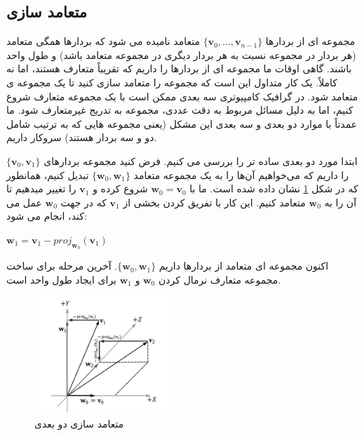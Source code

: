 \subsection{\textbf{متعامد سازی}}
\label{subsec:1.3.1}
{
    \Large
    \begin{spacing}{1.5}
        مجموعه ای از بردارها $\{\textbf{v}_{0},...,\textbf{v}_{n-1}\}$ متعامد نامیده می شود که بردارها همگی متعامد (هر بردار در مجموعه نسبت به هر بردار دیگری در مجموعه متعامد باشد) و طول واحد باشند.
        گاهی اوقات ما مجموعه ای از بردارها را داریم که تقریباً متعارف هستند، اما نه کاملاً.
        یک کار متداول این است که مجموعه را متعامد سازی کنید تا یک مجموعه ی متعامد شود.
        در گرافیک کامپیوتری سه بعدی ممکن است با یک مجموعه متعارف شروع کنیم، اما به دلیل مسائل مربوط به دقت عددی، مجموعه به تدریج غیرمتعارف شود.
        ما عمدتاً با موارد دو بعدی و سه بعدی این مشکل (یعنی مجموعه هایی که به ترتیب شامل دو و سه بردار هستند) سروکار داریم.

        ابتدا مورد دو بعدی ساده تر را بررسی می کنیم.
        فرض کنید مجموعه بردارهای $\{\textbf{v}_{0},\textbf{v}_{1}\}$ را داریم که می‌خواهیم آن‌ها را به یک مجموعه متعامد $\{\textbf{w}_{0},\textbf{w}_{1}\}$ تبدیل کنیم،
        همانطور که در شکل \ref{fig:4.Session.1.1.11} نشان داده شده است.
        ما با $\textbf{w}_{0}=\textbf{v}_{0}$ شروع کرده و $\textbf{v}_{1}$ را تغییر میدهیم تا آن را به $\textbf{w}_{0}$ متعامد کنیم.
        این کار با تفریق کردن بخشی از $\textbf{v}_{1}$ که در جهت $\textbf{w}_{0}$  عمل می کند، انجام می شود:

        \begin{center}
            $\textbf{w}_{1}=\textbf{v}_{1}-proj_{\textbf{w}_{0}}(\textbf{v}_{1})$
        \end{center}

        اکنون مجموعه ای متعامد از بردارها داریم $\{\textbf{w}_{0},\textbf{w}_{1}\}$.
        آخرین مرحله برای ساخت مجموعه متعارف نرمال کردن $\textbf{w}_{0}$ و $\textbf{w}_{1}$ برای ایجاد طول واحد است.

        \begin{figure}[H]
            \centering
            \setlength{\belowcaptionskip}{-10pt}
            \includegraphics[width=0.45\textwidth]{Images/4/1/4.Session.1.1.11}
            \caption{متعامد سازی دو بعدی}
            \label{fig:4.Session.1.1.11}
        \end{figure}


\end{spacing}}
